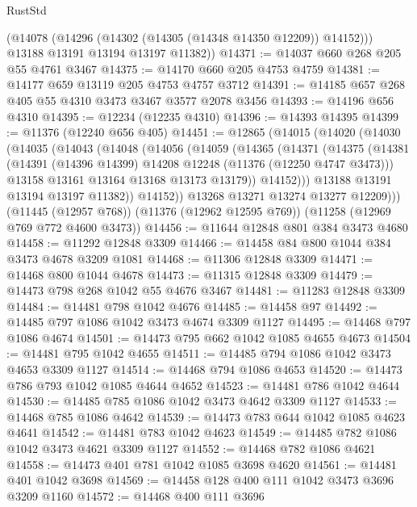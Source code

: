 \begin{lexlean}{RustStd}
\begin{coremodule}
{\begin{coremodule}
{{{{{{{{{{{{{{{{{{{{{{{{{{{{{{{{{{{{{{{{{{{{{{{{{{{{{{{{{{{{{{{{{{{{{{{{{{{{{{{{{{{{{        (@14078 (@14296 (@14302 (@14305 (@14348 @14350 @12209)) @14152)))
        @13188
        @13191
        @13194
        @13197
        @11382))
@14371 := @14037 @660 @268 @205 @55 @4761 @3467
@14375 := @14170 @660 @205 @4753 @4759
@14381 := @14177 @659 @13119 @205 @4753 @4757 @3712
@14391 := @14185 @657 @268 @405 @55 @4310 @3473 @3467 @3577 @2078 @3456
@14393 := @14196 @656 @4310
@14395 := @12234 (@12235 @4310)
@14396 := @14393 @14395
@14399 := @11376 (@12240 @656 @405)
@14451 := @12865
    (@14015
      (@14020
        (@14030
          (@14035
            (@14043
              (@14048
                (@14056
                  (@14059
                    (@14365
                      (@14371
                        (@14375
                          (@14381
                            (@14391 (@14396 @14399) @14208 @12248 (@11376 (@12250 @4747 @3473)))
                            @13158
                            @13161
                            @13164
                            @13168
                            @13173
                            @13179))
                        @14152)))
                  @13188
                  @13191
                  @13194
                  @13197
                  @11382))
              @14152))
          @13268
          @13271
          @13274
          @13277
          @12209)))
    (@11445 (@12957 @768))
    (@11376 (@12962 @12595 @769))
    (@11258 (@12969 @769 @772 @4600 @3473))
@14456 := @11644 @12848 @801 @384 @3473 @4680
@14458 := @11292 @12848 @3309
@14466 := @14458 @84 @800 @1044 @384 @3473 @4678 @3209 @1081
@14468 := @11306 @12848 @3309
@14471 := @14468 @800 @1044 @4678
@14473 := @11315 @12848 @3309
@14479 := @14473 @798 @268 @1042 @55 @4676 @3467
@14481 := @11283 @12848 @3309
@14484 := @14481 @798 @1042 @4676
@14485 := @14458 @97
@14492 := @14485 @797 @1086 @1042 @3473 @4674 @3309 @1127
@14495 := @14468 @797 @1086 @4674
@14501 := @14473 @795 @662 @1042 @1085 @4655 @4673
@14504 := @14481 @795 @1042 @4655
@14511 := @14485 @794 @1086 @1042 @3473 @4653 @3309 @1127
@14514 := @14468 @794 @1086 @4653
@14520 := @14473 @786 @793 @1042 @1085 @4644 @4652
@14523 := @14481 @786 @1042 @4644
@14530 := @14485 @785 @1086 @1042 @3473 @4642 @3309 @1127
@14533 := @14468 @785 @1086 @4642
@14539 := @14473 @783 @644 @1042 @1085 @4623 @4641
@14542 := @14481 @783 @1042 @4623
@14549 := @14485 @782 @1086 @1042 @3473 @4621 @3309 @1127
@14552 := @14468 @782 @1086 @4621
@14558 := @14473 @401 @781 @1042 @1085 @3698 @4620
@14561 := @14481 @401 @1042 @3698
@14569 := @14458 @128 @400 @111 @1042 @3473 @3696 @3209 @1160
@14572 := @14468 @400 @111 @3696
}}}}}}}}}}}}}}}}}}}}}}}}}}}}}}}}}}}}}}}}}}}}}}}}}}}}}}}}}}}}}}}}}}}}}}}}}}}}}}}}}}}}}
\end{coremodule}}
\end{coremodule}
\end{lexlean}
